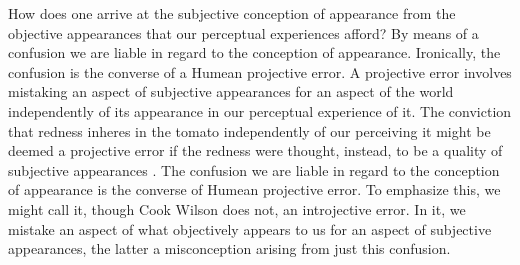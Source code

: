 \documentclass[12pt]{article}
\begin{document}
How does one arrive at the subjective conception of appearance from the objective appearances that our perceptual experiences afford? By means of a confusion we are liable in regard to the conception of appearance. Ironically, the confusion is the converse of a Humean projective error. A projective error involves mistaking an aspect of subjective appearances for an aspect of the world independently of its appearance in our perceptual experience of it. The conviction that redness inheres in the tomato independently of our perceiving it might be deemed a projective error if the redness were thought, instead, to be a quality of subjective appearances \citep[for a contemporary version of this view see][]{Boghossian-Velleman:1989af,Boghossian-Velleman:1991as}. 
The confusion we are liable in regard to the conception of appearance is the converse of Humean projective error. To emphasize this, we might call it, though Cook Wilson does not, an introjective error. In it, we mistake an aspect of what objectively appears to us for an aspect of subjective appearances, the latter a misconception arising from just this confusion.
\end{document}
